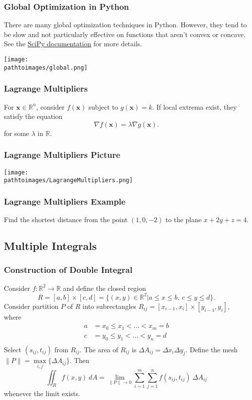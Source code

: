 \documentclass{beamer}
\newcommand{\pathtoimages}{/Users/charlesrambo/Desktop/Bootcamp24/Images}
\begin{document}
\begin{frame}
\frametitle{Global Optimization in Python}
\tiny
There are many global optimization techniques in Python. However, they tend to be slow and not particularly effective on functions that aren't convex or concave. See the \href{https://docs.scipy.org/doc/scipy/reference/optimize.html}{SciPy documentation} for more details. 
\begin{center}
\texttt{[image: \\pathtoimages/global.png]}
\end{center}
\end{frame}

\begin{frame}
\frametitle{Lagrange Multipliers}
For ${\boldsymbol x}\in \mathbb{R}^n$, consider $f({\boldsymbol x})$ subject to $g({\boldsymbol x}) = k$. If local extrema exist, they satisfy the equation
$$
\nabla f({\boldsymbol x}) = \lambda \nabla g({\boldsymbol x}).
$$
for some $\lambda$ in $\mathbb{R}$.
\end{frame}


\begin{frame}
\frametitle{Lagrange Multipliers Picture}
\begin{center}
\texttt{[image: \\pathtoimages/LagrangeMultipliers.png]}
\end{center}
\end{frame}

\begin{frame}[t]
\frametitle{Lagrange Multipliers Example}
\begin{Example}
Find the shortest distance from the point $(1, 0, -2)$ to the plane $x + 2y + z = 4$.
\end{Example}
\end{frame}

\subsection{Multiple Integrals}

\begin{frame}
\frametitle{Construction of Double Integral}
\tiny
Consider $f:\mathbb{R}^2\to\mathbb{R}$ and define the closed region
$$
R = [a, b]\times [c, d] = \{(x, y)\in\mathbb{R}^2| a\leq x\leq b,\ c\leq y\leq d\}.
$$
Consider partition $P$ of $R$ into subrectangles $R_{ij} = [x_{i - 1}, x_i]\times [y_{i - 1}, y_i]$, where
\begin{align*}
a &= x_0 \leq x_1 < \ldots < x_m = b\\
c &= y_0 \leq y_1 < \ldots < y_n = d\\
\end{align*}
Select $(s_{ij}, t_{ij})$ from $R_{ij}$. The area of $R_{ij}$ is $\Delta A_{ij} = \Delta x_i\Delta y_j$. Define the mesh $\|P\| = \max\limits_{i, j}\{\Delta A_{ij}\}$. Then
$$
\iint_R f(x, y)\ dA = \lim_{\|P\|\to 0} \sum_{i = 1}^m\sum_{j = 1}^n f(s_{ij}, t_{ij})\ \Delta A_{ij}
$$
whenever the limit exists.
\end{frame}
\end{document}
